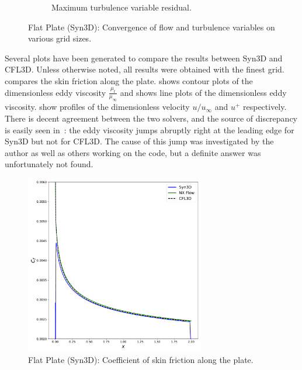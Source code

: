 \begin{figure}[ht!]
\begin{subfigure}{.45\textwidth}
    \caption{Maximum turbulence variable residual.}
\end{subfigure}
\caption{Flat Plate (Syn3D): Convergence of flow and turbulence variables on various grid sizes.}
\label{fig:synflatcnvstudy}
\end{figure}

Several plots have been generated to compare the results between Syn3D and CFL3D. Unless otherwise noted, all results were obtained with the finest grid.  compares the skin friction along the plate.  shows contour plots of the dimensionless eddy viscosity $\frac{\mu_t}{\mu_{\infty}}$ and  shows line plots of the dimensionless eddy viscosity.  show profiles of the dimensionless velocity $u/u_\infty$ and $u^+$ respectively. There is decent agreement between the two solvers, and the source of discrepancy is easily seen in~: the eddy viscosity jumps abruptly right at the leading edge for Syn3D but not for CFL3D. The cause of this jump was investigated by the author as well as others working on the code, but a definite answer was unfortunately not found.
\begin{figure}[ht!]
\centering
	\includegraphics[width=0.7\textwidth]{figs/flat/skin_friction.pdf}
    \caption{Flat Plate (Syn3D): Coefficient of skin friction along the plate.}
    \label{fig:synflatcf}
\end{figure}

